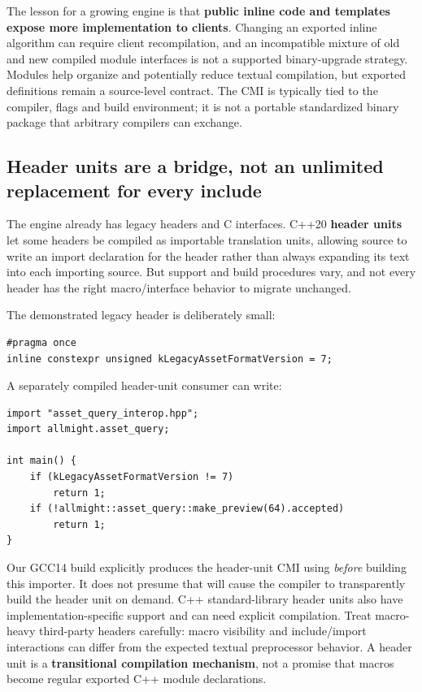 The lesson for a growing engine is that \textbf{public inline code and templates expose more implementation to clients}. Changing an exported inline algorithm can require client recompilation, and an incompatible mixture of old and new compiled module interfaces is not a supported binary-upgrade strategy. Modules help organize and potentially reduce textual compilation, but exported definitions remain a source-level contract. The CMI is typically tied to the compiler, flags and build environment; it is not a portable standardized binary package that arbitrary compilers can exchange.

\subsection{Header units are a bridge, not an unlimited replacement for every include}\label{05-engine-i-ch006-header-units-are-a-bridge-not-an-unlimited-replacement-for-every-include}

\hypertarget{05-engine-i-ch006-header-units-are-a-bridge-not-an-unlimited-replacement-for-every-include}{}

The engine already has legacy headers and C interfaces. C++20 \textbf{header units} let some headers be compiled as importable translation units, allowing source to write an import declaration for the header rather than always expanding its text into each importing source. But support and build procedures vary, and not every header has the right macro/interface behavior to migrate unchanged.

The demonstrated legacy header is deliberately small:

\begin{verbatim}
#pragma once
inline constexpr unsigned kLegacyAssetFormatVersion = 7;
\end{verbatim}

A separately compiled header-unit consumer can write:

\begin{verbatim}
import "asset_query_interop.hpp";
import allmight.asset_query;

int main() {
    if (kLegacyAssetFormatVersion != 7)
        return 1;
    if (!allmight::asset_query::make_preview(64).accepted)
        return 1;
}
\end{verbatim}

Our GCC14 build explicitly produces the header-unit CMI using  \emph{before} building this importer. It does not presume that  will cause the compiler to transparently build the header unit on demand. C++ standard-library header units also have implementation-specific support and can need explicit compilation. Treat macro-heavy third-party headers carefully: macro visibility and include/import interactions can differ from the expected textual preprocessor behavior. A header unit is a \textbf{transitional compilation mechanism}, not a promise that macros become regular exported C++ module declarations.

